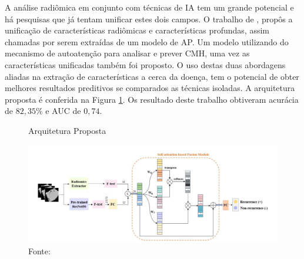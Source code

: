 

A análise radiômica em conjunto com técnicas de \gls{IA} tem um grande potencial e há pesquisas que já tentam unificar estes dois campos. O trabalho de , propôs a unificação de características radiômicas e características profundas, assim chamadas por serem extraídas de um modelo de \gls{AP}. Um modelo utilizando do mecanismo de autoatenção para analisar e prever \gls{CMH}, uma vez as características unificadas também foi proposto. O uso destas duas abordagens aliadas na extração de características a cerca da doença, tem o potencial de obter melhores resultados preditivos se comparados as técnicas isoladas. A arquitetura proposta é conferida na Figura \ref{fig:fig006}. Os resultado deste trabalho obtiveram acurácia de $82,35\%$ e AUC de $0,74$.

\begin{figure}[ht]
    \centering
    \captionsetup{justification=centering}
    \caption{Arquitetura Proposta}
    \includegraphics[width=1\textwidth]{figures/fig006.png}
    \caption*{Fonte: \cite{aiSelfAttentionBasedFusion2023}}
    \label{fig:fig006}
\end{figure}



